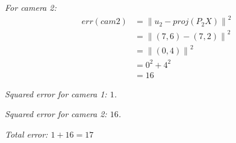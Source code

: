 \documentclass[11pt]{article}
\begin{document}
\begin{enumerate}
		{\it For camera 2:}
		\begin{align*}
			err(cam2) &= \left\| u_2 - proj(P_2X) \right\|^2 \\
			&= \left\| (7, 6) - (7, 2) \right\|^2 \\
			&= \left\| (0, 4) \right\|^2 \\
			&= 0^2 + 4^2 \\
			&= 16
		\end{align*}

		{\it Squared error for camera 1: $1$.}

		{\it Squared error for camera 2: $16$.}

		{\it Total error: $1+16=17$}


\end{enumerate}
\end{document}
